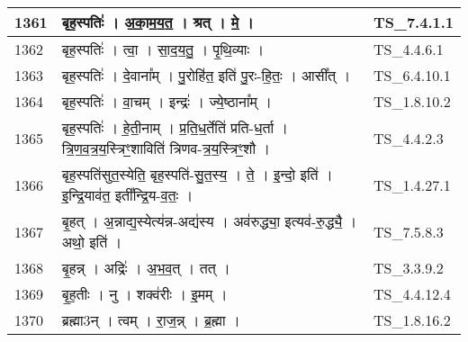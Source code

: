 \documentclass[17pt]{extarticle}
\begin{document}
\begin{longtable}{||p{0.4in}||p{4.9in}||p{0.9in}||}
    \hline
        
    1361 & बृह॒स्पतिः॑   ।   अ॒का॒म॒य॒त॒   ।   श्रत्   ।   मे॒   ।    & TS\_7.4.1.1       \\
    
    \hline
        
    1362 & बृह॒स्पतिः॑   ।   त्वा॒   ।   सा॒द॒य॒तु॒   ।   पृ॒थि॒व्याः   ।    & TS\_4.4.6.1       \\
    
    \hline
        
    1363 & बृह॒स्पतिः॑   ।   दे॒वाना᳚म्   ।   पु॒रोहि॑त॒ इति॑ पु॒रः{-}हि॒तः॒   ।   आसी᳚त्   ।    & TS\_6.4.10.1       \\
    
    \hline
        
    1364 & बृह॒स्पतिः॑   ।   वा॒चम्   ।   इन्द्रः॑   ।   ज्ये॒ष्ठाना᳚म्   ।    & TS\_1.8.10.2       \\
    
    \hline
        
    1365 & बृह॒स्पतिः॑   ।   हे॒ती॒नाम्   ।   प्र॒ति॒ध॒र्तेति॑ प्रति{-}ध॒र्ता   ।   त्रि॒ण॒व॒त्र॒य॒स्त्रिꣳ॒॒शाविति॑ त्रिणव{-}त्र॒य॒स्त्रिꣳ॒॒शौ   ।    & TS\_4.4.2.3       \\
    
    \hline
        
    1366 & बृह॒स्पति॑सुत॒स्येति॒ बृह॒स्पति॑{-}सु॒त॒स्य॒   ।   ते॒   ।   इ॒न्दो॒ इति॑   ।   इ॒न्द्रि॒याव॑त॒ इती᳚न्द्रि॒य{-}व॒तः॒   ।    & TS\_1.4.27.1       \\
    
    \hline
        
    1367 & बृ॒हत्   ।   अ॒न्नाद्य॒स्येत्य॑न्न{-}अद्य॑स्य   ।   अव॑रुद्ध्या॒ इत्यव॑{-}रु॒द्ध्यै॒   ।   अथो॒ इति॑   ।    & TS\_7.5.8.3       \\
    
    \hline
        
    1368 & बृ॒हन्न्   ।   अद्रिः॑   ।   अ॒भ॒व॒त्   ।   तत्   ।    & TS\_3.3.9.2       \\
    
    \hline
        
    1369 & बृ॒ह॒तीः   ।   नु   ।   शक्व॑रीः   ।   इ॒मम्   ।    & TS\_4.4.12.4       \\
    
    \hline
        
    1370 & ब्रह्मा3न्   ।   त्वम्   ।   रा॒ज॒न्न्   ।   ब्र॒ह्मा   ।    & TS\_1.8.16.2       \\
    

\end{longtable}
\end{document}
